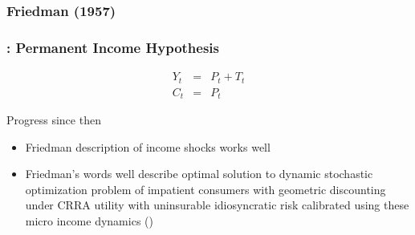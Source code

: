 \subsubsection{Friedman (1957)}
\begin{frame}
\frametitle{{\citet{friedmanAtheory}: Permanent Income Hypothesis}}
\begin{eqnarray*}
Y_{t}&=&P_{t}+T_{t}\\
C_{t}&=&P_{t}
\end{eqnarray*}

\begin{block}{Progress since then}
\begin{itemize}
  \item {} Friedman description of income shocks works well
  \item {} Friedman's words well describe optimal solution to dynamic stochastic optimization problem of impatient consumers with geometric discounting under CRRA utility with uninsurable idiosyncratic risk calibrated using these micro income dynamics (\jemph{!})
\end{itemize}
\end{block}

\end{frame}




